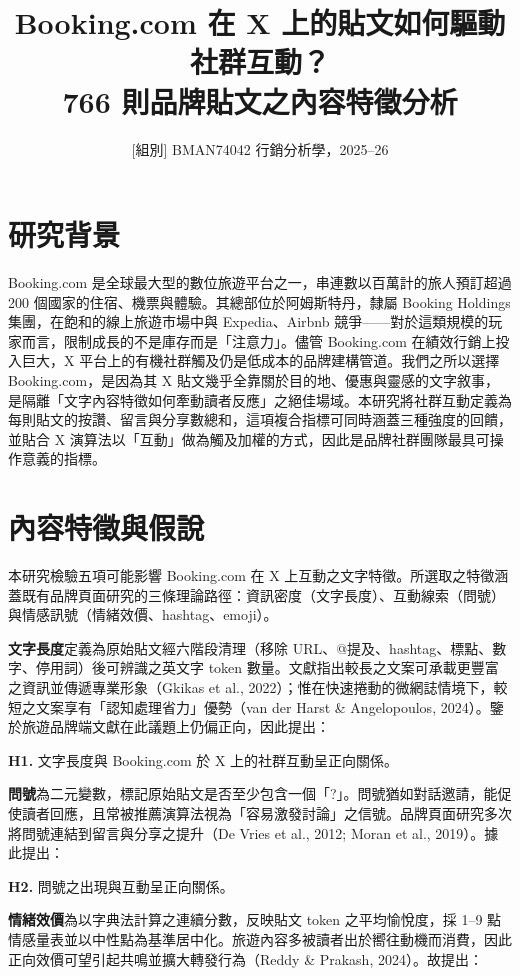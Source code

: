 \documentclass[12pt,a4paper]{ctexart}
\title{Booking.com 在 X 上的貼文如何驅動社群互動？\\[0.3em]
\large 766 則品牌貼文之內容特徵分析}
\author{[組別] \quad BMAN74042 行銷分析學，2025--26}
\date{}
\begin{document}
\maketitle

\section{研究背景}

Booking.com 是全球最大型的數位旅遊平台之一，串連數以百萬計的旅人預訂超過 200 個國家的住宿、機票與體驗。其總部位於阿姆斯特丹，隸屬 Booking Holdings 集團，在飽和的線上旅遊市場中與 Expedia、Airbnb 競爭——對於這類規模的玩家而言，限制成長的不是庫存而是「注意力」。儘管 Booking.com 在績效行銷上投入巨大，X 平台上的有機社群觸及仍是低成本的品牌建構管道。我們之所以選擇 Booking.com，是因為其 X 貼文幾乎全靠關於目的地、優惠與靈感的文字敘事，是隔離「文字內容特徵如何牽動讀者反應」之絕佳場域。本研究將社群互動定義為每則貼文的按讚、留言與分享數總和，這項複合指標可同時涵蓋三種強度的回饋，並貼合 X 演算法以「互動」做為觸及加權的方式，因此是品牌社群團隊最具可操作意義的指標。

\section{內容特徵與假說}

本研究檢驗五項可能影響 Booking.com 在 X 上互動之文字特徵。所選取之特徵涵蓋既有品牌頁面研究的三條理論路徑：資訊密度（文字長度）、互動線索（問號）與情感訊號（情緒效價、hashtag、emoji）。

\textbf{文字長度}定義為原始貼文經六階段清理（移除 URL、@提及、hashtag、標點、數字、停用詞）後可辨識之英文字 token 數量。文獻指出較長之文案可承載更豐富之資訊並傳遞專業形象（Gkikas et al., 2022）；惟在快速捲動的微網誌情境下，較短之文案享有「認知處理省力」優勢（van der Harst \& Angelopoulos, 2024）。鑒於旅遊品牌端文獻在此議題上仍偏正向，因此提出：

\textbf{H1.} 文字長度與 Booking.com 於 X 上的社群互動呈正向關係。

\textbf{問號}為二元變數，標記原始貼文是否至少包含一個「?」。問號猶如對話邀請，能促使讀者回應，且常被推薦演算法視為「容易激發討論」之信號。品牌頁面研究多次將問號連結到留言與分享之提升（De Vries et al., 2012; Moran et al., 2019）。據此提出：

\textbf{H2.} 問號之出現與互動呈正向關係。

\textbf{情緒效價}為以字典法計算之連續分數，反映貼文 token 之平均愉悅度，採 1--9 點情感量表並以中性點為基準居中化。旅遊內容多被讀者出於嚮往動機而消費，因此正向效價可望引起共鳴並擴大轉發行為（Reddy \& Prakash, 2024）。故提出：
\end{document}
